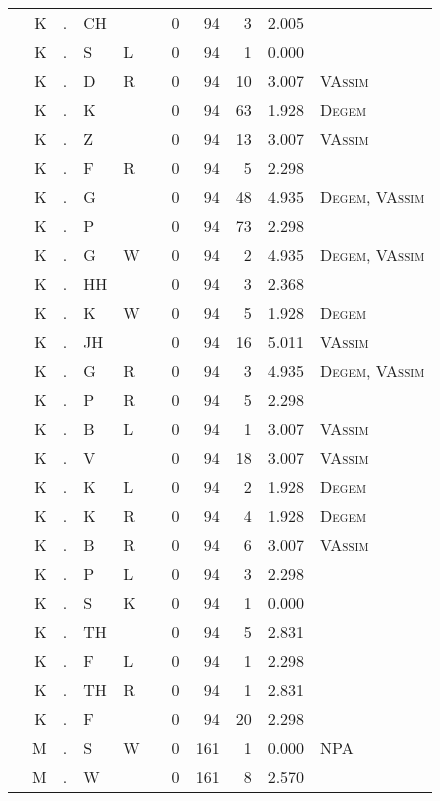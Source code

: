 \begin{longtable}{r@{ } r@{ } c@{ } l@{ } l@{ } l@{ } r r r r l }
 & K & . & CH &  &  & 0 & 94 & 3 & 2.005 &  \\
 & K & . & S & L &  & 0 & 94 & 1 & 0.000 &  \\
 & K & . & D & R &  & 0 & 94 & 10 & 3.007 & \textsc{VAssim} \\
 & K & . & K &  &  & 0 & 94 & 63 & 1.928 & \textsc{Degem} \\
 & K & . & Z &  &  & 0 & 94 & 13 & 3.007 & \textsc{VAssim} \\
 & K & . & F & R &  & 0 & 94 & 5 & 2.298 &  \\
 & K & . & G &  &  & 0 & 94 & 48 & 4.935 & \textsc{Degem}, \textsc{VAssim} \\
 & K & . & P &  &  & 0 & 94 & 73 & 2.298 &  \\
 & K & . & G & W &  & 0 & 94 & 2 & 4.935 & \textsc{Degem}, \textsc{VAssim} \\
 & K & . & HH &  &  & 0 & 94 & 3 & 2.368 &  \\
 & K & . & K & W &  & 0 & 94 & 5 & 1.928 & \textsc{Degem} \\
 & K & . & JH &  &  & 0 & 94 & 16 & 5.011 & \textsc{VAssim} \\
 & K & . & G & R &  & 0 & 94 & 3 & 4.935 & \textsc{Degem}, \textsc{VAssim} \\
 & K & . & P & R &  & 0 & 94 & 5 & 2.298 &  \\
 & K & . & B & L &  & 0 & 94 & 1 & 3.007 & \textsc{VAssim} \\
 & K & . & V &  &  & 0 & 94 & 18 & 3.007 & \textsc{VAssim} \\
 & K & . & K & L &  & 0 & 94 & 2 & 1.928 & \textsc{Degem} \\
 & K & . & K & R &  & 0 & 94 & 4 & 1.928 & \textsc{Degem} \\
 & K & . & B & R &  & 0 & 94 & 6 & 3.007 & \textsc{VAssim} \\
 & K & . & P & L &  & 0 & 94 & 3 & 2.298 &  \\
 & K & . & S & K &  & 0 & 94 & 1 & 0.000 &  \\
 & K & . & TH &  &  & 0 & 94 & 5 & 2.831 &  \\
 & K & . & F & L &  & 0 & 94 & 1 & 2.298 &  \\
 & K & . & TH & R &  & 0 & 94 & 1 & 2.831 &  \\
 & K & . & F &  &  & 0 & 94 & 20 & 2.298 &  \\
 & M & . & S & W &  & 0 & 161 & 1 & 0.000 & \textsc{NPA} \\
 & M & . & W &  &  & 0 & 161 & 8 & 2.570 &  \\

\end{longtable}
